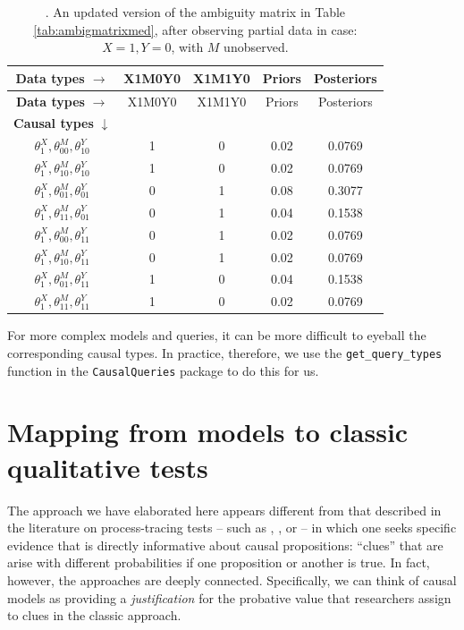 \documentclass[
  12pt,
]{book}
\begin{document}
\begin{longtable}[]{@{}ccccc@{}}
\caption{\label{tab:ambigmedupdatepartial2}. An updated version of the ambiguity matrix in Table \ref{tab:ambigmatrixmed}, after observing partial data in case: \(X=1, Y=0\), with \(M\) unobserved.}\tabularnewline
\toprule
\textbf{Data types} \(\rightarrow\) & X1M0Y0 & X1M1Y0 & Priors & Posteriors \\
\midrule
\endfirsthead
\toprule
\textbf{Data types} \(\rightarrow\) & X1M0Y0 & X1M1Y0 & Priors & Posteriors \\
\midrule
\endhead
\textbf{Causal types} \(\downarrow\) & & & & \\
\(\theta^X_1,\theta^M_{00},\theta^Y_{10}\) & 1 & 0 & 0.02 & 0.0769 \\
\(\theta^X_1,\theta^M_{10},\theta^Y_{10}\) & 1 & 0 & 0.02 & 0.0769 \\
\(\theta^X_1,\theta^M_{01},\theta^Y_{01}\) & 0 & 1 & 0.08 & 0.3077 \\
\(\theta^X_1,\theta^M_{11},\theta^Y_{01}\) & 0 & 1 & 0.04 & 0.1538 \\
\(\theta^X_1,\theta^M_{00},\theta^Y_{11}\) & 0 & 1 & 0.02 & 0.0769 \\
\(\theta^X_1,\theta^M_{10},\theta^Y_{11}\) & 0 & 1 & 0.02 & 0.0769 \\
\(\theta^X_1,\theta^M_{01},\theta^Y_{11}\) & 1 & 0 & 0.04 & 0.1538 \\
\(\theta^X_1,\theta^M_{11},\theta^Y_{11}\) & 1 & 0 & 0.02 & 0.0769 \\
\bottomrule
\end{longtable}

For more complex models and queries, it can be more difficult to eyeball the corresponding causal types. In practice, therefore, we use the \texttt{get\_query\_types} function in the \texttt{CausalQueries} package to do this for us.

\hypertarget{mapping-from-models-to-classic-qualitative-tests}{%
\section{Mapping from models to classic qualitative tests}\label{mapping-from-models-to-classic-qualitative-tests}}

The approach we have elaborated here appears different from that described in the literature on process-tracing tests -- such as \citet{collier2011understanding}, \citet{BennettBayes}, or \citet{humphreys2015mixing} -- in which one seeks specific evidence that is directly informative about causal propositions: ``clues'' that are arise with different probabilities if one proposition or another is true. In fact, however, the approaches are deeply connected. Specifically, we can think of causal models as providing a \emph{justification} for the probative value that researchers assign to clues in the classic approach.
\end{document}
